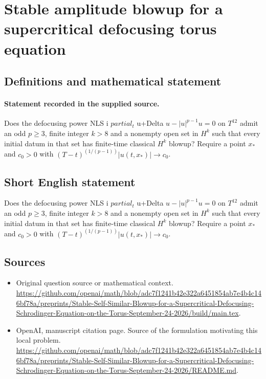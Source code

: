 \documentclass[11pt]{article}
\begin{document}
\section*{Stable amplitude blowup for a supercritical defocusing torus equation}\label{statement}
\subsection{Definitions and mathematical statement}
\paragraph{Statement recorded in the supplied source.}
Does the defocusing power NLS i $partial_t$ u+Delta $u-|u|^{p-1}u=0$ on $T^12$ admit an odd $p\geq 3$, finite integer $k>8$ and a nonempty open set in $H^k$ such that every initial datum in that set has finite-time classical $H^k$ blowup? Require a point $x_*$ and $c_0>0$ with $(T-t)^(1/(p-1))|u(t,x_*)|\to c_0$.
\subsection{Short English statement}
Does the defocusing power NLS i $partial_t$ u+Delta $u-|u|^{p-1}u=0$ on $T^12$ admit an odd $p\geq 3$, finite integer $k>8$ and a nonempty open set in $H^k$ such that every initial datum in that set has finite-time classical $H^k$ blowup? Require a point $x_*$ and $c_0>0$ with $(T-t)^(1/(p-1))|u(t,x_*)|\to c_0$.
\subsection{Sources}
\begin{itemize}
\item[S1] Original question source or mathematical context.
\url{https://github.com/openai/math/blob/adc7f1241b42e322a6451854ab7e4b4c146bf78a/preprints/Stable-Self-Similar-Blowup-for-a-Supercritical-Defocusing-Schrodinger-Equation-on-the-Torus-September-24-2026/build/main.tex}.
\item[S2] OpenAI, manuscript citation page. Source of the formulation motivating this local problem.
\url{https://github.com/openai/math/blob/adc7f1241b42e322a6451854ab7e4b4c146bf78a/preprints/Stable-Self-Similar-Blowup-for-a-Supercritical-Defocusing-Schrodinger-Equation-on-the-Torus-September-24-2026/README.md}.
\end{itemize}
\end{document}
